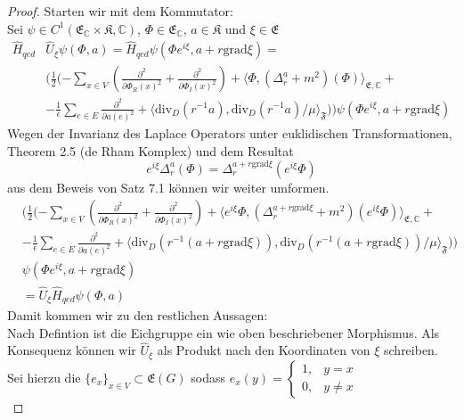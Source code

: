 \documentclass[11pt,a4paper,leqno]{report}
\numberwithin{equation}{chapter}
\begin{document}
\begin{proof}
Starten wir mit dem Kommutator:\\
Sei $\psi\in C^1(\mathfrak{E}_\mathbb{C}\times\mathfrak{K},\mathbb{C})$, $\Phi\in \mathfrak{E}_\mathbb{C}$, $a\in \mathfrak{K}$ und $\xi\in \mathfrak{E}$
\begin{align*}
	\hat{H}_{qed}&\hat{U}_\xi\psi(\Phi, a)= \hat{H}_{qed}\psi(\Phi e^{i\xi}, a + r \text{grad}\xi)=\\&(\frac{1}{2}(-\sum_{x\in V}(\frac{\partial^2}{\partial\Phi_R(x)^2} +\frac{\partial^2}{\partial\Phi_I(x)^2})+\langle \Phi, (\Delta_r^a + m^2)(\Phi)\rangle_{\mathfrak{E},\mathbb{C}}+\\ &-\frac{1}{\epsilon}\sum_{e\in E}\frac{\partial^2}{\partial a(e)^2} + \langle \text{div}_D(r^{-1}a), \text{div}_D(r^{-1}a)/\mu\rangle_{\mathfrak{F}}))\psi(\Phi e^{i\xi}, a + r \text{grad}\xi)
\end{align*}
Wegen der Invarianz des Laplace Operators unter euklidischen Transformationen, Theorem 2.5 (de Rham Komplex) und dem Resultat
\begin{equation}
	e^{i\xi}\Delta_r^a(\Phi) = \Delta_r^{a + r\text{grad}\xi}(e^{i\xi}\Phi)
\end{equation}
aus dem Beweis von Satz 7.1 k\"onnen wir weiter umformen.
\begin{align*}
	&(\frac{1}{2}(-\sum_{x\in V}(\frac{\partial^2}{\partial\Phi_R(x)^2} +\frac{\partial^2}{\partial\Phi_I(x)^2})+\langle e^{i\xi}\Phi, (\Delta_r^{a+r\text{grad}\xi} + m^2)(e^{i\xi}\Phi)\rangle_{\mathfrak{E},\mathbb{C}}+\\ &-\frac{1}{\epsilon}\sum_{e\in E}\frac{\partial^2}{\partial a(e)^2} + \langle \text{div}_D(r^{-1}(a+r\text{grad}\xi)), \text{div}_D(r^{-1}(a+r\text{grad}\xi))/\mu\rangle_{\mathfrak{F}}))\\&\psi(\Phi e^{i\xi}, a + r \text{grad}\xi)\\
	&=\hat{U}_\xi\hat{H}_{qed}\psi(\Phi, a)
\end{align*}
Damit kommen wir zu den restlichen Aussagen:\\
Nach Defintion ist die Eichgruppe ein wie oben beschriebener Morphismus. Als Konsequenz k\"onnen wir $\hat{U}_\xi$ als Produkt nach den Koordinaten von $\xi$ schreiben.\\
Sei hierzu die $\{e_x\}_{x\in V}\subset\mathfrak{E}(G)$ sodass $e_x(y)=\begin{cases} 1, & y=x \\
								0, & y\neq x
				\end{cases}$
\begin{equation*}

\end{equation*}
\end{proof}
\end{document}
